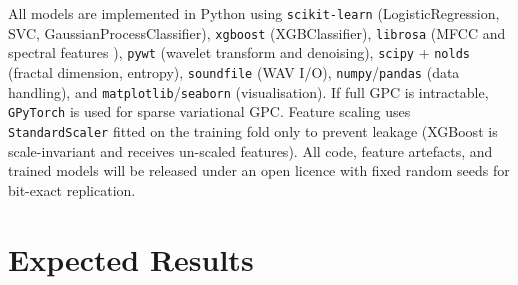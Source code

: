 \documentclass[10pt,twocolumn]{article}
\begin{document}
All models are implemented in Python using \texttt{scikit-learn} (LogisticRegression, SVC, GaussianProcessClassifier), \texttt{xgboost} (XGBClassifier), \texttt{librosa} (MFCC and spectral features \citep{librosa2015}), \texttt{pywt} (wavelet transform and denoising), \texttt{scipy} + \texttt{nolds} (fractal dimension, entropy), \texttt{soundfile} (WAV I/O), \texttt{numpy}/\texttt{pandas} (data handling), and \texttt{matplotlib}/\texttt{seaborn} (visualisation). If full GPC is intractable, \texttt{GPyTorch} is used for sparse variational GPC. Feature scaling uses \texttt{StandardScaler} fitted on the training fold only to prevent leakage (XGBoost is scale-invariant and receives un-scaled features). All code, feature artefacts, and trained models will be released under an open licence with fixed random seeds for bit-exact replication.

\section{Expected Results}
\end{document}

